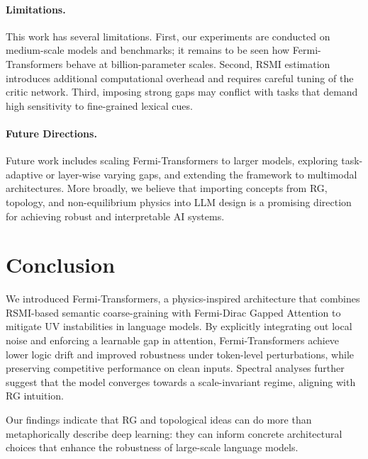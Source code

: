\documentclass{article}
\begin{document}
\paragraph{Limitations.}
This work has several limitations. First, our experiments are conducted on medium-scale models and benchmarks; it remains to be seen how Fermi-Transformers behave at billion-parameter scales. Second, RSMI estimation introduces additional computational overhead and requires careful tuning of the critic network. Third, imposing strong gaps may conflict with tasks that demand high sensitivity to fine-grained lexical cues.

\paragraph{Future Directions.}
Future work includes scaling Fermi-Transformers to larger models, exploring task-adaptive or layer-wise varying gaps, and extending the framework to multimodal architectures. More broadly, we believe that importing concepts from RG, topology, and non-equilibrium physics into LLM design is a promising direction for achieving robust and interpretable AI systems.

\section{Conclusion}

We introduced Fermi-Transformers, a physics-inspired architecture that combines RSMI-based semantic coarse-graining with Fermi-Dirac Gapped Attention to mitigate UV instabilities in language models. By explicitly integrating out local noise and enforcing a learnable gap in attention, Fermi-Transformers achieve lower logic drift and improved robustness under token-level perturbations, while preserving competitive performance on clean inputs. Spectral analyses further suggest that the model converges towards a scale-invariant regime, aligning with RG intuition.

Our findings indicate that RG and topological ideas can do more than metaphorically describe deep learning: they can inform concrete architectural choices that enhance the robustness of large-scale language models.

\newpage


\end{document}

